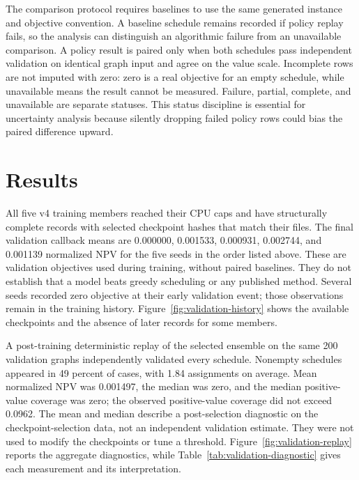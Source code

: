 \documentclass[11pt]{article}
\begin{document}
The comparison protocol requires baselines to use the same generated instance and objective convention. A baseline schedule remains recorded if policy replay fails, so the analysis can distinguish an algorithmic failure from an unavailable comparison. A policy result is paired only when both schedules pass independent validation on identical graph input and agree on the value scale. Incomplete rows are not imputed with zero: zero is a real objective for an empty schedule, while unavailable means the result cannot be measured. Failure, partial, complete, and unavailable are separate statuses. This status discipline is essential for uncertainty analysis because silently dropping failed policy rows could bias the paired difference upward.

\section{Results}
All five v4 training members reached their CPU caps and have structurally complete records with selected checkpoint hashes that match their files. The final validation callback means are 0.000000, 0.001533, 0.000931, 0.002744, and 0.001139 normalized NPV for the five seeds in the order listed above. These are validation objectives used during training, without paired baselines. They do not establish that a model beats greedy scheduling or any published method. Several seeds recorded zero objective at their early validation event; those observations remain in the training history. Figure~\ref{fig:validation-history} shows the available checkpoints and the absence of later records for some members.

A post-training deterministic replay of the selected ensemble on the same 200 validation graphs independently validated every schedule. Nonempty schedules appeared in 49 percent of cases, with 1.84 assignments on average. Mean normalized NPV was 0.001497, the median was zero, and the median positive-value coverage was zero; the observed positive-value coverage did not exceed 0.0962. The mean and median describe a post-selection diagnostic on the checkpoint-selection data, not an independent validation estimate. They were not used to modify the checkpoints or tune a threshold. Figure~\ref{fig:validation-replay} reports the aggregate diagnostics, while Table~\ref{tab:validation-diagnostic} gives each measurement and its interpretation.
\end{document}
